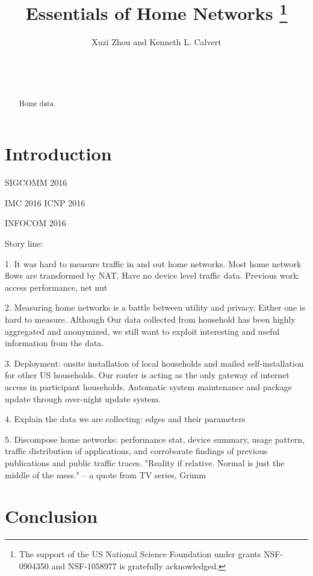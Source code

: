 \documentclass[conference,pdftex,hyphens]{sig-alternate-05-2015}
\begin{document}
\title{Essentials of Home Networks
\thanks{The support of the US National Science 
Foundation under grants \mbox{NSF-0904350} and \mbox{NSF-1058977} is 
gratefully acknowledged.}\vspace{-0.77em}}

\author{
\alignauthor
Xuzi Zhou and Kenneth L. Calvert\\
	\\
	\\
	\\
}


\maketitle
\thispagestyle{plain}
\pagestyle{plain}
\begin{abstract}
Home data.
\end{abstract}

\section{Introduction}

SIGCOMM 2016

IMC 2016
ICNP 2016

INFOCOM 2016

Story line:

1. It was hard to measure traffic in and out home networks. Most home network flows are transformed by NAT. Have no device level traffic data.
Previous work: access performance, net nut

2. Measuring home networks is a battle between utility and privacy. Either one is hard to measure. Although Our data collected from household has been highly aggregated and anonymized, we still want to exploit interesting and useful information from the data.

3. Deployment:  onsite installation of local households and mailed self-installation for other US households.
Our router is acting as the only gateway of internet access in participant households.
Automatic system maintenance and package update through over-night update system. 

4. Explain the data we are collecting: edges and their parameters

5. Discompose home networks: performance stat, device summary, usage pattern, traffic distribution of applications, and corroborate findings of previous publications and public traffic traces.
"Reality if relative. Normal is just the middle of the mess." -- a quote from TV series, Grimm


\section{Conclusion}
\label{sec:conclusion}

%
%
\end{document}
